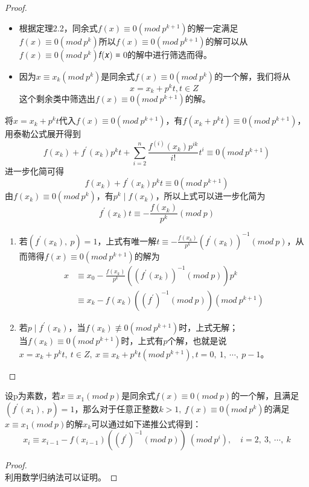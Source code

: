 \documentclass[cn,10pt]{elegantbook}
\begin{document}
\begin{proof}
  \begin{itemize}
    \item 根据定理2.2，同余式$f(x) \equiv 0(mod\ p^{k+1})$的解一定满足$f(x) \equiv 0(mod\ p^k)$所以$f(x) \equiv 0(mod\ p^{k+1})$的解可以从$f(x) \equiv 0(mod\ p^k)$𝑓(𝑥) ≡ 0的解中进行筛选而得。
    \item 因为$x \equiv x_k(mod\ p^k)$是同余式$f(x) \equiv 0(mod\ p^k)$的一个解，我们将从
    \begin{equation*}
      x = x_k+p^kt, t \in Z
    \end{equation*}
    这个剩余类中筛选出$f(x) \equiv 0(mod\ p^{k+1})$的解。
  \end{itemize}
  将$x = x_k+p^kt$代入$f(x) \equiv 0(mod\ p^{k+1})$，有$f(x_k+p^kt) \equiv 0(mod\ p^{k+1})$，用泰勒公式展开得到
  \begin{equation*}
    f(x_k)+f^{\prime}(x_k)p^kt+ \sum_{i =2}^{n} \frac{f^{(i)}(x_k)p^{ik}}{i!} t^i \equiv 0(mod\ p^{k+1})
  \end{equation*}
  进一步化简可得
  \begin{equation*}
    f(x_k)+f^{\prime}(x_k)p^kt \equiv 0(mod\ p^{k+1})
  \end{equation*}
  由$f(x_k) \equiv 0(mod\ p^k)$，有$p^k \mid f(x_k)$，所以上式可以进一步化简为
  \begin{equation*}
    f^{\prime}(x_k)t \equiv - \frac{f(x_k)}{p^k}(mod\ p)
  \end{equation*}
  \begin{enumerate}[(1)]
    \item 若$(f^{\prime}(x_k),\ p) =1$，上式有唯一解$t \equiv - \frac{f(x_k)}{p^k}(f^{\prime}(x_k))^{-1}(mod\ p)$，从而筛得$f(x) \equiv 0 (mod\ p^{k+1})$的解为
    \begin{align*}
      x & \equiv x_0 - \frac{f(x_k)}{p^k}((f^{\prime}(x_k))^{-1}(mod\ p))p^k
      \\& \equiv x_k - f(x_k)((f^{\prime})^{-1}(mod\ p))(mod\ p^{k+1})
    \end{align*}
    \item  若$p \mid f^{\prime}(x_k)$，当$f(x_k) \not\equiv 0(mod\ p^{k+1})$时，上式无解；
    \\当$f(x_k) \equiv 0(mod\ p^{k+1})$时，上式有$p$个解，也就是说$x = x_k+p^kt,\ t \in Z,\ x \equiv x_k+p^kt(mod\ p^{k+1}), t =0,\ 1,\ \cdots ,\ p-1$。
  \end{enumerate}
\end{proof}
\vskip 0.5cm
\begin{conclusion}
  设p为素数，若$x \equiv x_1(mod\ p)$是同余式$f(x) \equiv 0(mod\ p)$的一个解，且满足$(f^{\prime}(x_1),\ p) = 1$，那么对于任意正整数$k>1,\ f(x) \equiv 0(mod\ p^k)$的满足$x \equiv x_1(mod\ p)$的解$x_k$可以通过如下递推公式得到：
  \begin{equation*}
    x_i \equiv x_{i-1}-f(x_{i-1})((f^{\prime})^{-1}(mod\ p))\ (mod\ p^i),\quad i = 2,\ 3,\ \cdots ,\ k
  \end{equation*}
\end{conclusion}
\begin{proof}
  \\利用数学归纳法可以证明。
\end{proof}
\end{document}
